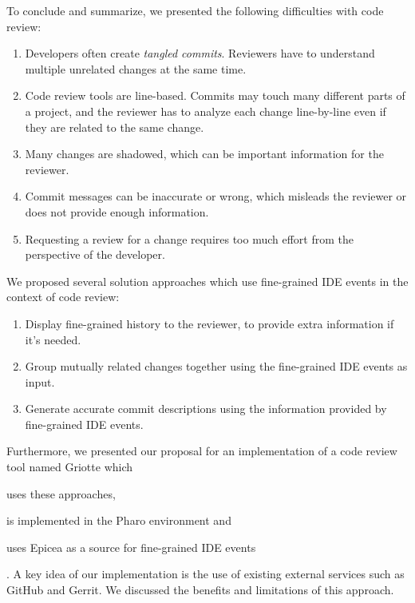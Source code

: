 \documentclass[conference,a4paper]{IEEEtran}
\begin{document}
To conclude and summarize, we presented the following difficulties
with code review:
\begin{enumerate}[label=(\arabic*)]
\item Developers often create \textit{tangled commits}. Reviewers have
  to understand multiple unrelated changes at the same time.
\item Code review tools are line-based. Commits may touch many
  different parts of a project, and the reviewer has to analyze each
  change line-by-line even if they are related to the same change.
\item Many changes are shadowed, which can be important information
  for the reviewer.
\item Commit messages can be inaccurate or wrong, which misleads the
  reviewer or does not provide enough information.
\item Requesting a review for a change requires too much effort from
  the perspective of the developer.
\end{enumerate}

We proposed several solution approaches which use fine-grained IDE
events in the context of code review:
\begin{enumerate}[label=(\arabic*)]
\item Display fine-grained history to the reviewer, to provide extra
  information if it's needed.
\item Group mutually related changes together using the fine-grained
  IDE events as input.
\item Generate accurate commit descriptions using the information
  provided by fine-grained IDE events.
\end{enumerate}

Furthermore, we presented our proposal for an implementation of a code
review tool named Griotte which \begin{enumerate*}[label=(\arabic*)]
\item uses these approaches, \item is implemented in the Pharo
  environment and \item uses Epicea as a source for fine-grained IDE
  events \end{enumerate*}. A key idea of our implementation is the use
of existing external services such as GitHub and Gerrit. We discussed
the benefits and limitations of this approach.



\end{document}
